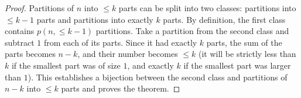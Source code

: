 

\setcounter{section}{3}
\setcounter{subsection}{7}
\setcounter{dfn}{17}

\begin{proof}
Partitions of $n$ into $\le k$ parts can be split into two classes:
partitions into $\le k-1$ parts and partitions into exactly $k$ parts.
By definition, the first class contains $p(n, \le k-1)$ partitions.
Take a partition from the second class and subtract $1$ from each of its parts.
Since it had exactly $k$ parts, the sum of the parts becomes $n-k$,
and their number becomes $\le k$ (it will be strictly less than $k$ if the smallest part was of size $1$,
and exactly $k$ if the smallest part was larger than $1$).
This establishes a bijection between the second class and partitions of $n-k$ into $\le k$ parts
and proves the theorem.
\end{proof}

